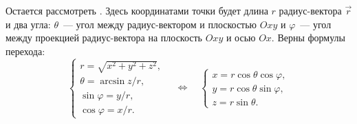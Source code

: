 Остается рассмотреть . Здесь координатами точки будет длина $r$ радиус-вектора $\vec{r}$ и два угла: $\theta$~--- угол между радиус-вектором и плоскостью $Oxy$ и $\varphi$~--- угол между проекцией радиус-вектора на плоскость $Oxy$ и осью $Ox$. Верны формулы перехода:
\begin{equation}
	\begin{cases}
		r = \sqrt{x^2 + y^2 + z^2},\\
		\theta = \arcsin{z/r},\\
		\sin \varphi = y/r,\\
		\cos \varphi = x/r.
	\end{cases}
	\quad \Leftrightarrow \quad
	\begin{cases}
		x = r \cos \theta \cos \varphi	,\\
		y = r \cos \theta \sin \varphi,\\
		z = r \sin \theta.
	\end{cases}
\end{equation}
